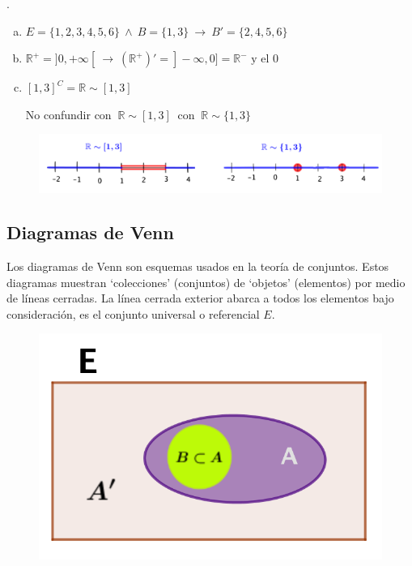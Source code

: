 \begin{example}

	. 	\begin{enumerate}[a) ]
	\item $E=\{1,2,3,4,5,6\}	 \ \wedge \ B=\{1,3\} \ \to \ B'=\{2,4,5,6\}$
	\item $\mathbb R^+=]0,+\infty[ \ \to \ (\mathbb R^+)'=]-\infty,0]=\mathbb R^- \text{ y el } 0$
	\item $[1,3]^C = \mathbb R \sim [1,3]$
	
	No confundir con  $ \ \mathbb R \sim [1,3] \ $ con $ \ \mathbb R \sim \{1,3\} \ $
	\end{enumerate}	
	
	\vspace{-5mm} %
	\begin{figure}[H]
	\centering
	\includegraphics[width=.9\textwidth]{imagenes/apendices/app01.png}
	\end{figure}

\end{example}

\subsection{Diagramas de Venn}

\begin{multicols}{2}

	\begin{small}Los diagramas de Venn son esquemas usados en la teoría de conjuntos. Estos diagramas muestran `colecciones' (conjuntos) de `objetos' (elementos) por medio de líneas cerradas. La línea cerrada exterior abarca a todos los elementos bajo consideración, es el conjunto universal o referencial $E$.\end{small}
		
	\begin{figure}[H]
	\centering
	\includegraphics[width=.4\textwidth]{imagenes/apendices/app02.png}
	\end{figure}
	
\end{multicols}

